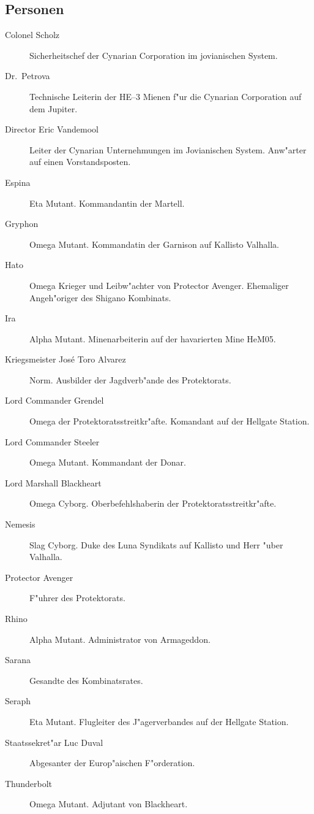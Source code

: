 \begin{appendices}
\section{Personen}

\begin{description}
\item [Colonel Scholz] Sicherheitschef der Cynarian Corporation im jovianischen System.
\item [Dr.~Petrova] Technische Leiterin der HE--3 Mienen f"ur die Cynarian Corporation auf dem Jupiter.
\item [Director Eric Vandemool] Leiter der Cynarian Unternehmungen im Jovianischen System. Anw"arter auf einen
      Vorstandsposten.
\item [Espina] Eta Mutant. Kommandantin der Martell.
\item [Gryphon] Omega Mutant. Kommandatin der Garnison auf Kallisto Valhalla.
\item [Hato] Omega Krieger und Leibw"achter von Protector Avenger. Ehemaliger Angeh"origer des Shigano Kombinats.
\item [Ira] Alpha Mutant. Minenarbeiterin auf der havarierten Mine HeM05.
\item [Kriegsmeister Jos\'{e} \frqq{}Toro\flqq{} Alvarez] Norm. Ausbilder der Jagdverb"ande des Protektorats.
\item [Lord Commander Grendel] Omega der Protektoratsstreitkr"afte. Komandant auf der Hellgate Station.
\item [Lord Commander Steeler] Omega Mutant. Kommandant der Donar.
\item [Lord Marshall Blackheart] Omega Cyborg. Oberbefehlshaberin der Protektoratsstreitkr"afte.
\item [Nemesis] Slag Cyborg. Duke des Luna Syndikats auf Kallisto und Herr "uber Valhalla.
\item [Protector Avenger] F"uhrer des Protektorats.
\item [Rhino] Alpha Mutant. Administrator von Armageddon.
\item [Sarana] Gesandte des Kombinatsrates.
\item [Seraph] Eta Mutant. Flugleiter des J"agerverbandes auf der Hellgate Station.
\item [Staatssekret"ar Luc Duval] Abgesanter der Europ"aischen F"orderation.
\item [Thunderbolt] Omega Mutant. Adjutant von Blackheart.
\end{description}

\end{appendices}